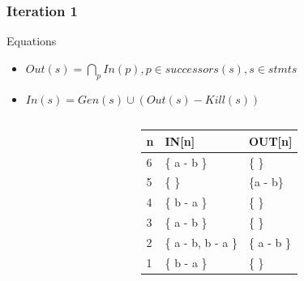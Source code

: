 \begin{frame}[fragile, t]
 \frametitle{Iteration 1} 

\begin{center}
\begin{scriptsize}
\begin{minipage}{8cm}
    \begin{block}{Equations}
    \begin{itemize}
        \item $Out(s) = \bigcap_p In(p), p \in successors(s), s \in stmts$
	    \item $In(s) = Gen(s) \cup (Out(s) - Kill(s))$  
    \end{itemize}
    \end{block}
\end{minipage}
\end{scriptsize}
\end{center}

\begin{columns}[T]
\begin{column}[T]{.4\textwidth}
    \vspace{0pt}
    
    \end{column}
    \begin{column}[T]{.6\textwidth}
\vspace{30pt}    
	\begin{scriptsize}
	   \begin{table}[]
\begin{tabular}{|l|l|l|}
\hline
n & IN{[}n{]} & OUT{[}n{]} \\ \hline
6  & \{ a - b \} & \{ \} \pause \\ \hline
5  & \{ \} & \{a - b\} \pause \\ \hline
4  & \{ b - a \} & \{ \} \pause \\ \hline
3  & \{ a - b \} & \{ \} \pause \\ \hline
2  & \{ a - b, b - a \} & \{ a - b \}\pause \\ \hline
1  & \{ b - a \} & \{  \}\pause \\ \hline
\end{tabular}
\end{table}   
	\end{scriptsize}
	\end{column}
    
\end{columns}

\end{frame}






















